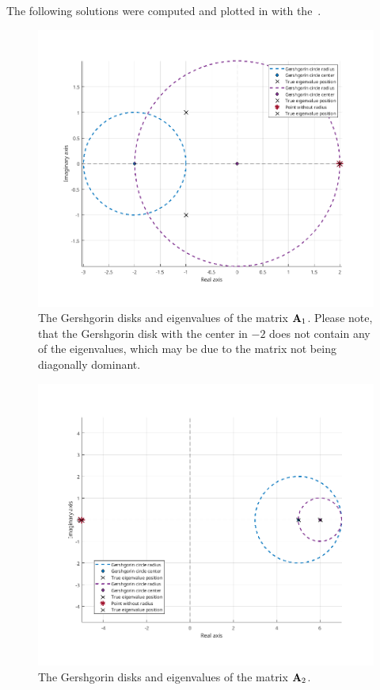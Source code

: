 The following solutions were computed and plotted in \MATLAB{} with the~.
\begin{figure}[H]
    \centering
    \includegraphics[width=1\textwidth]{problems/Figures/Problem_7/first_matrix.png}
    \caption{The Gershgorin disks and eigenvalues of the matrix $\mathbf{A}_1$.
    Please note, that the Gershgorin disk with the center in $-2$ does not contain any
    of the eigenvalues, which may be due to the matrix not being diagonally dominant.
    }
\end{figure}
\begin{figure}[H]
    \centering
    \includegraphics[width=1\textwidth]{problems/Figures/Problem_7/second_matrix.png}
    \caption{The Gershgorin disks and eigenvalues of the matrix $\mathbf{A}_2$.}
\end{figure}
